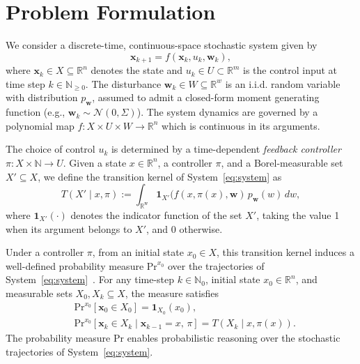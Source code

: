 \documentclass[journal,twoside,web]{ieeecolor}
\newcommand{\LL}[1]{{\color{red}[LL: #1]}}
\newcommand{\ml}[1]{{\color{blue}[ML: #1]}}
\newcommand{\pw}{\mathbf{w}}
\newcommand{\px}{\mathbf{x}}
\newcommand{\pX}{\mathbf{x}}
\newcommand{\naturals}{\mathbb{N}}
\newcommand{\naturalszero}{\mathbb{N}_{\geq 0}}
\theoremstyle{definition}
\theoremstyle{plain}
\theoremstyle{plain}
\begin{document}
\section{Problem Formulation}

We consider a discrete-time, continuous-space stochastic system given by
\begin{equation}
\label{eq:system}
    \px_{k+1} = f(\px_k, u_k, \pw_k),
\end{equation}
where $\px_k \in X \subseteq \mathbb{R}^n$ denotes the state and $u_k \in U \subset \mathbb{R}^m$ is the control input at time step $k \in \naturalszero$. The disturbance $\pw_k\in W \subseteq \mathbb{R}^w$ is an i.i.d. random variable with distribution $p_{\mathbf{w}}$, assumed to admit a closed-form moment generating function (e.g., $\pw_k \sim \mathcal{N}(0,\Sigma)$). 
The system dynamics are governed by a polynomial map $f: X \times U \times W \to \mathbb{R}^n$ which is continuous in its arguments. 

The choice of control $u_k$ is determined by a time-dependent \emph{feedback controller} $\pi: X \times \naturals \to U$.
Given a state $x \in \mathbb{R}^n$, a controller $\pi$, and a Borel-measurable set $X' \subseteq X$, we define the transition kernel of System~\eqref{eq:system} as
\begin{equation}
\label{eq:transition_kernel}
    T(X' \mid x,\pi) := \int_{\mathbb{R}^{\mathrm{w}}} \mathbf{1}_{X'}(f(x,\pi(x), \pw ) \, p_{\mathbf{w}}(w) \, dw,
\end{equation}
where $\mathbf{1}_{X'}(\cdot)$ denotes the indicator function of the set $X'$, taking the value 1 when its argument belongs to $X'$, and 0 otherwise.

Under a controller $\pi$, from an initial state $x_0 \in X$, this transition kernel induces a well-defined probability measure $\mathrm{Pr}^{x_0}$ over the trajectories of System~\eqref{eq:system}~\cite{bertsekas2004stochastic}. For any time-step $k \in \mathbb{N}_0$, initial state $x_0 \in \mathbb{R}^n$, and measurable sets $X_0, X_k \subseteq X$, the measure satisfies
\begin{subequations}
\label{eq:prob measure}
    \begin{align}
        &\mathrm{Pr}^{x_0}[\pX_0 \in X_0] = \mathbf{1}_{X_0}(x_0), \\
        &\mathrm{Pr}^{x_0}[\pX_k \in X_k \mid \pX_{k-1} = x, \, \pi] = T(X_k \mid x, \pi(x)).
    \end{align}
\end{subequations}
The probability measure $\mathrm{Pr}$ enables probabilistic reasoning over the stochastic trajectories of System~\eqref{eq:system}. 
\end{document}
